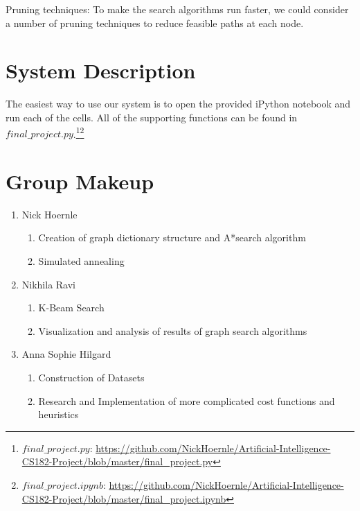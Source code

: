 \documentclass[11pt]{article}
\begin{document}
Pruning techniques:
To make the search algorithms run faster, we could consider a number of pruning
techniques to reduce feasible paths at each node.

\appendix
\section{System Description}

The easiest way to use our system is to open the provided iPython notebook and run each of the cells. All of the supporting functions can be found in $final\_project.py$.\footnote{$final\_project.py$: \url{https://github.com/NickHoernle/Artificial-Intelligence-CS182-Project/blob/master/final_project.py}}\footnote{$final\_project.ipynb$: \url{https://github.com/NickHoernle/Artificial-Intelligence-CS182-Project/blob/master/final_project.ipynb}}

\section{Group Makeup}

\begin{enumerate}
\item Nick Hoernle
\begin{enumerate}
\item Creation of graph dictionary structure and A*search algorithm
\item Simulated annealing
\end{enumerate}
\item Nikhila Ravi
\begin{enumerate}
\item K-Beam Search
\item Visualization and analysis of results of graph search algorithms
\end{enumerate}
\item Anna Sophie Hilgard
\begin{enumerate}
\item Construction of Datasets
\item Research and Implementation of more complicated cost functions and heuristics
\end{enumerate}
\end{enumerate}
\end{document}
